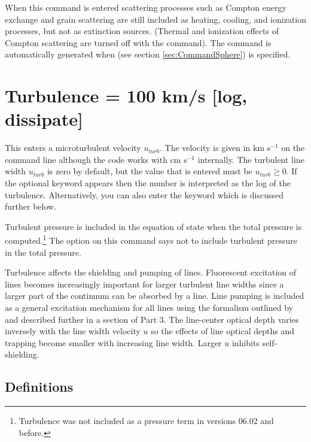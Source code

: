 When this command
is entered scattering processes such as Compton energy exchange 
and grain scattering are still included
as heating, cooling, and ionization processes, but not as extinction sources.
(Thermal and ionization effects of Compton scattering are turned off with
the  command).
The  command is automatically
generated when  (see section \ref{sec:CommandSphere}) is specified.

\section{Turbulence = 100 km/s [log, dissipate]}

This enters a microturbulent velocity $u_{turb}$.
The velocity is given in
km s$^{-1}$ on the command line although the code works with
cm s$^{-1}$ internally. The turbulent line width $u_{turb}$ is zero by default,
but the value that is entered must be $u_{turb} \ge 0$.
If the optional keyword  appears then the number
is interpreted as the log of the turbulence. Alternatively, you can
also enter the keyword  which is discussed
further below.

Turbulent pressure is included in the equation of state when the total
pressure is computed.\footnote{Turbulence was not included as a pressure term in versions 06.02
and before.}
The 
option on this command says not to include turbulent pressure in the total
pressure.

Turbulence affects the shielding and pumping of lines.
Fluorescent
excitation of lines becomes increasingly important for larger turbulent
line widths since a larger part of the continuum can be absorbed by a line.
Line pumping is included as a general excitation mechanism for all lines
using the formalism outlined by \citet{Ferland1992} and described further in
a section of Part 3.
The line-center optical depth varies inversely with
the line width velocity $u$ so the effects of line optical depths
and trapping become smaller with increasing line width.
Larger $u$ inhibits self-shielding.

\subsection{Definitions }

